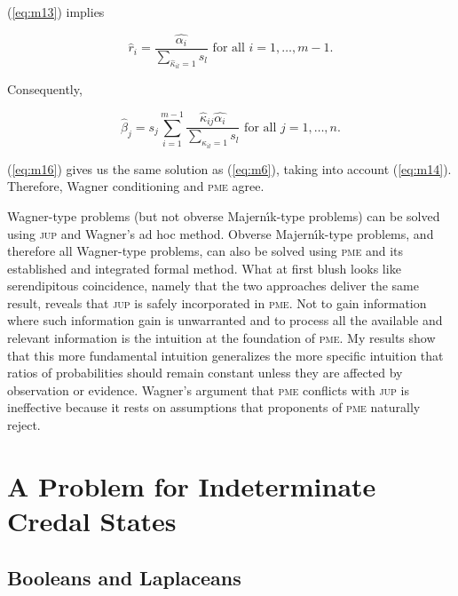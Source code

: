 \documentclass[phd,12pt,oneside]{ubcthesis}
\begin{document}
{\noindent}(\ref{eq:m13}) implies

\begin{equation}
  \label{eq:m15}
  \hat{r}_{i}=\frac{\hat{\alpha_{i}}}{\sum_{\hat{\kappa}_{il}=1}s_{l}}\mbox{ for all }i=1,\ldots,m-1.
\end{equation}

{\noindent}Consequently,

\begin{equation}
  \label{eq:m16}
  \hat{\beta}_{j}=s_{j}\sum_{i=1}^{m-1}\frac{\hat{\kappa}_{ij}\hat{\alpha_{i}}}{\sum_{\kappa_{il}=1}s_{l}}\mbox{ for all }j=1,\ldots,n.
\end{equation}

{\noindent}(\ref{eq:m16}) gives us the same solution as (\ref{eq:m6}),
taking into account (\ref{eq:m14}). Therefore, Wagner conditioning and
\textsc{pme} agree.

Wagner-type problems (but not obverse Majern{\'\i}k-type problems) can
be solved using \textsc{jup} and Wagner's ad hoc method. Obverse
Majern{\'\i}k-type problems, and therefore all Wagner-type problems,
can also be solved using \textsc{pme} and its established and
integrated formal method. What at first blush looks like serendipitous
coincidence, namely that the two approaches deliver the same result,
reveals that \textsc{jup} is safely incorporated in \textsc{pme}. Not
to gain information where such information gain is unwarranted and to
process all the available and relevant information is the intuition at
the foundation of \textsc{pme}. My results show that this more
fundamental intuition generalizes the more specific intuition that
ratios of probabilities should remain constant unless they are
affected by observation or evidence. Wagner's argument that
\textsc{pme} conflicts with \textsc{jup} is ineffective because it
rests on assumptions that proponents of \textsc{pme} naturally reject.

\chapter{A Problem for Indeterminate Credal States}
\label{chp:eingeili}

\section{Booleans and Laplaceans}
\label{sec:chiegaen}
\end{document}
